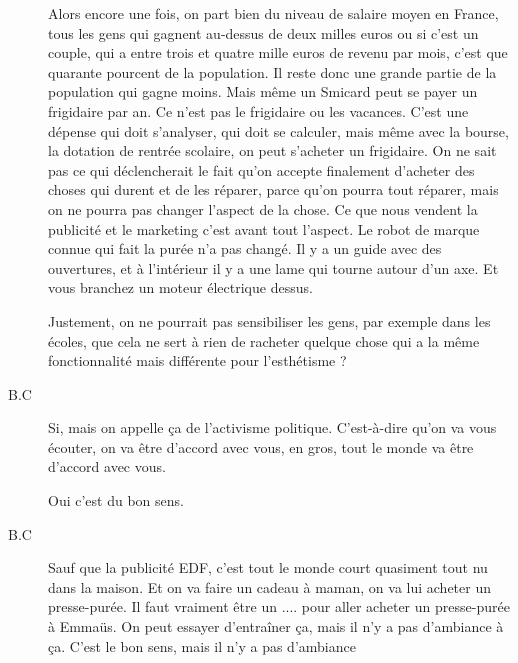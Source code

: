 \begin{description}
Alors encore une fois, on part bien du niveau de salaire moyen en France, tous les gens qui gagnent au-dessus de deux milles euros ou si c'est un couple, qui a entre trois et quatre mille euros de revenu par mois, c'est que quarante pourcent de la population. Il reste donc une grande partie de la population qui gagne moins. Mais même un Smicard peut se payer un frigidaire par an. Ce n'est pas le frigidaire ou les vacances. C'est une dépense qui doit s'analyser, qui doit se calculer, mais même avec la bourse, la dotation de rentrée scolaire, on peut s'acheter un frigidaire. On ne sait pas ce qui déclencherait le fait qu'on accepte finalement d'acheter des choses qui durent et de les réparer, parce qu'on pourra tout réparer, mais on ne pourra pas changer l'aspect de la chose. Ce que nous vendent la publicité et le marketing c'est avant tout l'aspect. Le robot de marque connue qui fait la purée n'a pas changé. Il y a un guide avec des ouvertures, et à l'intérieur il y a une lame qui tourne autour d'un axe. Et vous branchez un moteur électrique dessus.

\vspace{1\baselineskip}

Justement, on ne pourrait pas sensibiliser les gens, par exemple dans les écoles, que cela ne sert à rien de racheter quelque chose qui a la même fonctionnalité mais différente pour l'esthétisme ?

\vspace{1\baselineskip}

\item[B.C]Si, mais on appelle ça de l'activisme politique. C'est-à-dire qu’on va vous écouter, on va être d'accord avec vous, en gros, tout le monde va être d'accord avec vous. 

\vspace{1\baselineskip}

Oui c'est du bon sens.

\vspace{1\baselineskip}

\item[B.C]Sauf que la publicité EDF, c'est tout le monde court quasiment tout nu dans la maison. Et on va faire un cadeau à maman, on va lui acheter un presse-purée. Il faut vraiment être un .... pour aller acheter un presse-purée à Emmaüs. On peut essayer d’entraîner ça, mais il n'y a pas d'ambiance à ça. C'est le bon sens, mais il n'y a pas d'ambiance

\vspace{1\baselineskip}


\end{description}

